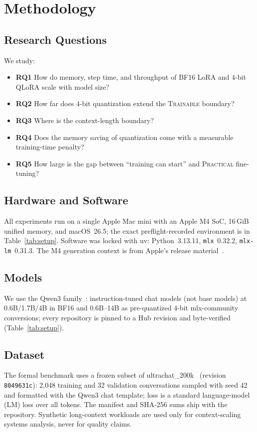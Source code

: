 \documentclass[10pt,twocolumn]{article}
\newcommand{\trainable}{\textsc{Trainable}\xspace}
\newcommand{\practical}{\textsc{Practical}\xspace}
\begin{document}
\section{Methodology}
\label{sec:method}
\subsection{Research Questions}
We study:
\begin{itemize}
  \item \textbf{RQ1} How do memory, step time, and throughput of BF16 LoRA and
        4-bit QLoRA scale with model size?
  \item \textbf{RQ2} How far does 4-bit quantization extend the
        \trainable boundary?
  \item \textbf{RQ3} Where is the context-length boundary?
  \item \textbf{RQ4} Does the memory saving of quantization come with a
        measurable training-time penalty?
  \item \textbf{RQ5} How large is the gap between ``training can start'' and
        \practical fine-tuning?
\end{itemize}

\subsection{Hardware and Software}
All experiments run on a single Apple Mac mini with an Apple M4 SoC, 16\,GiB
unified memory, and macOS~26.5; the exact preflight-recorded environment is in
Table~\ref{tab:setup}. Software was locked with uv: Python~3.13.11,
\texttt{mlx}~0.32.2, \texttt{mlx-lm}~0.31.3. The M4 generation context is from
Apple's release material~\cite{applem4}.


\subsection{Models}
We use the Qwen3 family~\cite{yang2025qwen3}: instruction-tuned chat models
(not base models) at 0.6B/1.7B/4B in BF16 and 0.6B--14B as pre-quantized 4-bit
mlx-community conversions; every repository is pinned to a Hub revision and
byte-verified (Table~\ref{tab:setup}).

\subsection{Dataset}
The formal benchmark uses a frozen subset of
ultrachat\_200k~\cite{ding2023ultrachat} (revision \texttt{8049631c}): 2{,}048
training and 32 validation conversations sampled with seed 42 and formatted
with the Qwen3 chat template; loss is a standard language-model (LM) loss over all tokens.
The manifest and SHA-256 sums ship with the repository. Synthetic long-context
workloads are used only for context-scaling systems analysis, never for
quality claims.
\end{document}
